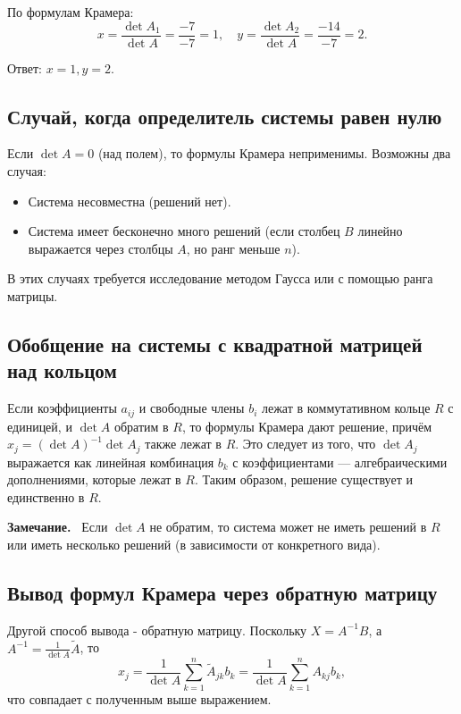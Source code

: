 \documentclass[a4paper,12pt]{article}
\newcommand{\myremark}{\textbf{Замечание.}\ }
\theoremstyle{definition}
\theoremstyle{plain}
\theoremstyle{remark}
\begin{document}
	По формулам Крамера:
	\[
	x = \frac{\det A_1}{\det A} = \frac{-7}{-7} = 1, \quad y = \frac{\det A_2}{\det A} = \frac{-14}{-7} = 2.
	\]
	
	Ответ: \(x = 1, y = 2\).
	
	\subsection{Случай, когда определитель системы равен нулю}
	
	Если \(\det A = 0\) (над полем), то формулы Крамера неприменимы. Возможны два случая:
	\begin{itemize}
		\item Система несовместна (решений нет).
		\item Система имеет бесконечно много решений (если столбец \(B\) линейно выражается через столбцы \(A\), но ранг меньше \(n\)).
	\end{itemize}
	В этих случаях требуется исследование методом Гаусса или с помощью ранга матрицы.
	
	\subsection{Обобщение на системы с квадратной матрицей над кольцом}
	
	Если коэффициенты \(a_{ij}\) и свободные члены \(b_i\) лежат в коммутативном кольце \(R\) с единицей, и \(\det A\) обратим в \(R\), то формулы Крамера дают решение, причём \(x_j = (\det A)^{-1} \det A_j\) также лежат в \(R\). Это следует из того, что \(\det A_j\) выражается как линейная комбинация \(b_k\) с коэффициентами — алгебраическими дополнениями, которые лежат в \(R\). Таким образом, решение существует и единственно в \(R\).
	
	\myremark
	Если \(\det A\) не обратим, то система может не иметь решений в \(R\) или иметь несколько решений (в зависимости от конкретного вида).
	
	\subsection{Вывод формул Крамера через обратную матрицу}
	
	Другой способ вывода - обратную матрицу. Поскольку \(X = A^{-1}B\), а \(A^{-1} = \frac{1}{\det A} \tilde{A}\), то
	\[
	x_j = \frac{1}{\det A} \sum_{k=1}^n \tilde{A}_{jk} b_k = \frac{1}{\det A} \sum_{k=1}^n A_{kj} b_k,
	\]
	что совпадает с полученным выше выражением.
	
	
	
\end{document}

